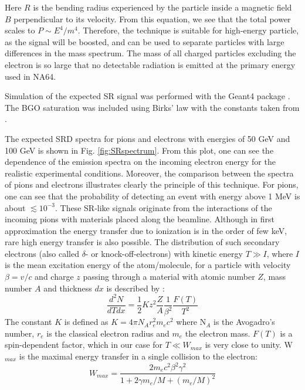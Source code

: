Here $R$ is the bending radius experienced by the particle inside a magnetic field $B$ perpendicular to its velocity. From this equation, we see that the total power scales to $P\sim E^4/m^4$. Therefore, the technique is suitable for high-energy particle, as the signal will be boosted, and can be used to separate particles with large differences in the mass spectrum. The mass of all charged particles excluding the electron is so large that no detectable radiation is emitted at the primary energy used in NA64. 

Simulation of the expected SR signal was performed with the Geant4 package \cite{ALLISON2016186,1610988,AGOSTINELLI2003250}. The BGO saturation was included using Birks' law with the constants taken from \cite{AVDEICHIKOV2002251}.

The expected SRD spectra for pions and electrons with energies of 50 GeV and 100 GeV is shown in Fig. \ref{fig:SRspectrum}. From this plot, one can see the dependence of the emission spectra on the incoming electron energy for the realistic experimental conditions. Moreover, the comparison between the spectra of pions and electrons illustrates clearly the principle of this technique. For pions, one can see that the probability of detecting an event with energy above 1 MeV is about $\lesssim 10^{-3}$.
These SR-like signals originate from the interactions of the incoming pions with materials placed along the beamline. Although in first approximation the energy transfer due to ionization is in the order of few \si{\kilo\electronvolt}, rare high energy transfer is also possible. The distribution of such secondary electrons (also called $\delta$- or knock-off-electrons) with
kinetic energy $T\gg I$, where $I$ is the mean excitation energy of the
atom/molecule, for a particle with velocity $\beta=v/c$ and charge $z$
passing through a material with atomic number $Z$, mass number $A$ and
thickness $dx$ is described by \cite{review-particle-physics}:
\begin{equation}
\frac{d^2N}{dTdx} = \frac{1}{2}K z^2 \frac{Z}{A}
\frac{1}{\beta^2}\frac{F(T)}{T^2}
\label{eqn:knock-on}
\end{equation}
The constant $K$ is defined as $K=4\pi N_A r_e^2 m_e c^2$ where N$_A$ is
the Avogadro's number, $r_e$ is the classical electron radius and $m_e$
the electron mass.
$F(T)$ is a spin-dependent factor, which in our case for $T \ll W_{max}$
is very close to unity. W$_{max}$ is the maximal energy transfer in a single collision to the
electron:
\begin{equation}
W_{max} = \frac{2m_e c^2 \beta^2 \gamma^2}{1+ 2\gamma m_e/M+(m_e/M)^2}
\end{equation}

